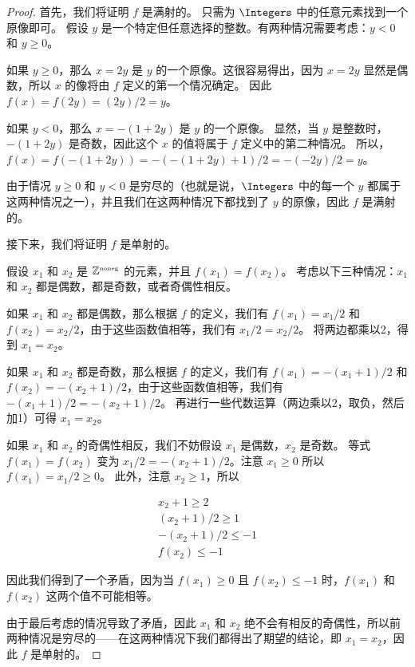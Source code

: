 \begin{proof}
首先，我们将证明 $f$ 是满射的。
只需为 $\Integers$ 中的任意元素找到一个原像即可。
假设 $y$ 是一个特定但任意选择的整数。有两种情况需要考虑：$y<0$ 和 $y\geq0$。

如果 $y\geq0$，那么 $x=2y$ 是 $y$ 的一个原像。这很容易得出，因为 $x=2y$ 显然是偶数，所以 $x$ 的像将由 $f$ 定义的第一个情况确定。
因此 $f(x) = f(2y) = (2y)/2 = y$。

如果 $y < 0$，那么 $x=-(1+2y)$ 是 $y$ 的一个原像。
显然，当 $y$ 是整数时，$-(1+2y)$ 是奇数，因此这个 $x$ 的值将属于 $f$ 定义中的第二种情况。
所以，$f(x) = f(-(1+2y)) = -(-(1+2y)+1)/2 = -(-2y)/2 = y$。

由于情况 $y \geq 0$ 和 $y < 0$ 是穷尽的（也就是说，$\Integers$ 中的每一个 $y$ 都属于这两种情况之一），并且我们在这两种情况下都找到了 $y$ 的原像，因此 $f$ 是满射的。

接下来，我们将证明 $f$ 是单射的。

假设 $x_1$ 和 $x_2$ 是 ${\mathbb Z}^{\mbox{\tiny noneg}}$ 的元素，并且 $f(x_1)=f(x_2)$。
考虑以下三种情况：$x_1$ 和 $x_2$ 都是偶数，都是奇数，或者奇偶性相反。

如果 $x_1$ 和 $x_2$ 都是偶数，那么根据 $f$ 的定义，我们有 $f(x_1) = x_1/2$ 和 $f(x_2) = x_2/2$，由于这些函数值相等，我们有 $x_1/2 = x_2/2$。
将两边都乘以2，得到 $x_1=x_2$。

如果 $x_1$ 和 $x_2$ 都是奇数，那么根据 $f$ 的定义，我们有 $f(x_1) = -(x_1+1)/2$ 和 $f(x_2) = -(x_2+1)/2$，由于这些函数值相等，我们有 $-(x_1+1)/2 = -(x_2+1)/2$。
再进行一些代数运算（两边乘以2，取负，然后加1）可得 $x_1=x_2$。

如果 $x_1$ 和 $x_2$ 的奇偶性相反，我们不妨假设 $x_1$ 是偶数，$x_2$ 是奇数。
等式 $f(x_1)=f(x_2)$ 变为 $x_1/2 = -(x_2+1)/2$。注意 $x_1 \ge 0$ 所以 $f(x_1) = x_1/2 \ge 0$。
此外，注意 $x_2 \geq 1$，所以

\begin{gather*}
x_2 + 1 \geq 2 \\
(x_2+1)/2 \geq 1 \\
-(x_2+1)/2 \leq -1 \\
f(x_2) \leq -1
\end{gather*}

因此我们得到了一个矛盾，因为当 $f(x_1) \geq 0$ 且 $f(x_2) \leq -1$ 时，$f(x_1)$ 和 $f(x_2)$ 这两个值不可能相等。

由于最后考虑的情况导致了矛盾，因此 $x_1$ 和 $x_2$ 绝不会有相反的奇偶性，所以前两种情况是穷尽的——在这两种情况下我们都得出了期望的结论，即 $x_1 = x_2$，因此 $f$ 是单射的。
\end{proof}

